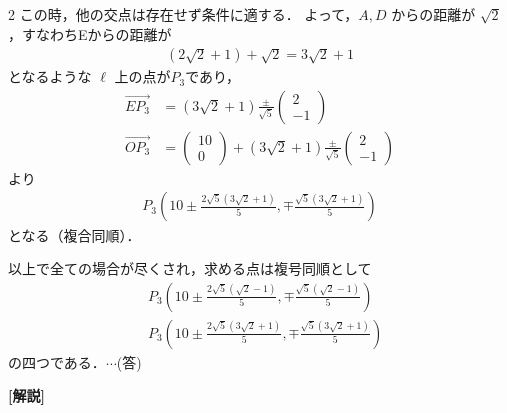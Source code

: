 \documentclass[../../../../main.tex]{subfiles}
\begin{document}
\begin{multicols}{2}
    この時，他の交点は存在せず条件に適する．
    よって，$A, D$ からの距離が $\sqrt{2}$ ，すなわちEからの距離が
    \begin{align*}
        \left(2\sqrt{2}+1\right) + \sqrt{2} = 3\sqrt{2}+1
    \end{align*}
    となるような $\ell$ 上の点が$P_3$であり，
    \begin{align*}
        \overrightarrow{EP_3}
         & = (3\sqrt{2}+1)\frac{\pm}{\sqrt{5}}\begin{pmatrix} 2 \\ -1 \end{pmatrix}                                          \\
        \overrightarrow{OP_3}
         & = \begin{pmatrix} 10 \\ 0 \end{pmatrix} + (3\sqrt{2}+1)\frac{\pm}{\sqrt{5}}\begin{pmatrix} 2 \\  -1 \end{pmatrix}
    \end{align*}
    より
    \begin{align*}
        P_3\left(10\pm\frac{2\sqrt{5}(3\sqrt{2}+1)}{5}, \mp\frac{\sqrt{5}(3\sqrt{2}+1)}{5}\right)
    \end{align*}
    となる（複合同順）．

    \vspace{5pt}
    以上で全ての場合が尽くされ，求める点は複号同順として
    \begin{align*}
         & P_3\left(10\pm\frac{2\sqrt{5}(\sqrt{2}-1)}{5}, \mp\frac{\sqrt{5}(\sqrt{2}-1)}{5}\right)   \\
         & P_3\left(10\pm\frac{2\sqrt{5}(3\sqrt{2}+1)}{5}, \mp\frac{\sqrt{5}(3\sqrt{2}+1)}{5}\right)
    \end{align*}
    の四つである．$\cdots$(答)

    \vspace{10pt}



    {\bf[解説]}

    \newpage
\end{multicols}
\end{document}
